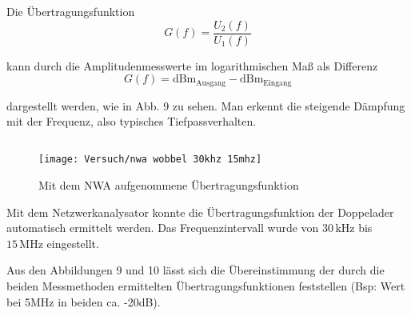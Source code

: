 \documentclass[a4paper, 12pt]{article}
\begin{document}
Die Übertragungsfunktion
$$ G(f) = \frac{U_2(f)}{U_1(f)} $$

kann durch die Amplitudenmesswerte im logarithmischen Maß als Differenz
$$G(f) = \textrm{dBm}_{\textrm{Ausgang}}-\textrm{dBm}_{\textrm{Eingang}}$$

\noindent dargestellt werden, wie in Abb. 9 zu sehen.
Man erkennt die steigende Dämpfung mit der Frequenz, also typisches
Tiefpassverhalten.

\subsection{}


\begin{figure}[H]
	\texttt{[image: Versuch/nwa wobbel 30khz 15mhz]}
  \caption{Mit dem NWA aufgenommene Übertragungsfunktion}
\end{figure}

Mit dem Netzwerkanalysator konnte die Übertragungsfunktion der Doppelader
automatisch ermittelt werden. Das Frequenzintervall wurde von $30 \,
\si{\kilo\hertz}$ bis $15 \, \si{\mega\hertz}$ eingestellt. 

Aus den Abbildungen 9 und 10 lässt sich die Übereinstimmung der durch die beiden
Messmethoden ermittelten Übertragungsfunktionen feststellen (Bsp: Wert bei 5MHz in beiden ca. -20dB).
\end{document}
